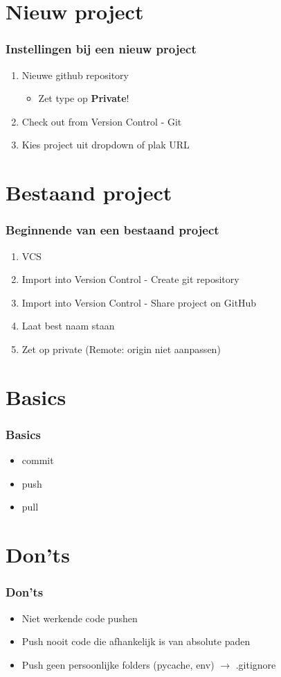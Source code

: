 	\section{Nieuw project}
    \begin{frame} 
		\frametitle{Instellingen bij een nieuw project}
		\begin{enumerate}
			\item Nieuwe github repository
				\begin{itemize}
					\item Zet type op \textbf{Private}!
				\end{itemize}
			\item Check out from Version Control - Git
			\item Kies project uit dropdown of plak URL		
		\end{enumerate}
	\end{frame}
	
	\section{Bestaand project}
	\begin{frame} 
		\frametitle{Beginnende van een bestaand project}
		\begin{enumerate}
			\item VCS
			\item Import into Version Control - Create git repository
			\item Import into Version Control - Share project on GitHub
			\item Laat best naam staan
			\item Zet op private (Remote: origin niet aanpassen)		
		\end{enumerate}
	\end{frame}
		
    \section{Basics}
    \begin{frame} 
		\frametitle{Basics}
		\begin{itemize}
			\item commit
			\item push
			\item pull
		\end{itemize}
	\end{frame}
	
	\section{Don'ts}
    \begin{frame} 
		\frametitle{Don'ts}
		\begin{itemize}
			\item Niet werkende code pushen
			\item Push nooit code die afhankelijk is van absolute paden
			\item Push geen persoonlijke folders (pycache, env) $\rightarrow$ .gitignore
		\end{itemize}
	\end{frame}
	
